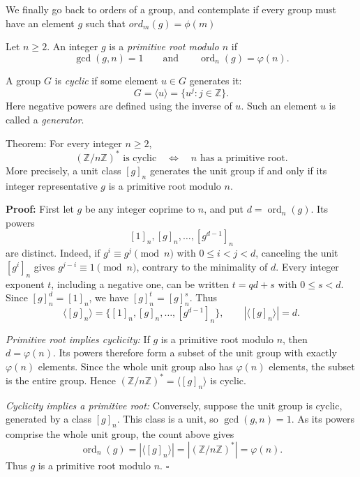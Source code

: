 \documentclass[a4paper,11pt,abstracton]{scrartcl}
\theoremstyle{dotlessP}
\theoremstyle{dotlessS}
\theoremstyle{remark}
\theoremstyle{definition}
\begin{document}
We finally go back to orders of a group, and contemplate if every group must have an element $g$ such that $ord_m(g)=\phi(m)$  

\begin{definition_box}
Let $n\geq2$. An integer $g$ is a \emph{primitive root modulo $n$} if
\[
    \gcd(g,n)=1\qquad\text{and}\qquad
    \operatorname{ord}_n(g)=\varphi(n).
\]
\end{definition_box}


\begin{definition_box}
A group $G$ is \emph{cyclic} if some element $u\in G$ generates it:
\[
    G=\langle u\rangle=\{u^j:j\in\mathbb{Z}\}.
\]
Here negative powers are defined using the inverse of $u$.
Such an element $u$ is called a \emph{generator}.
\end{definition_box}


\begin{mainbox}{Theorem:}
For every integer $n\geq2$,
\[
    \boxed{(\mathbb{Z}/n\mathbb{Z})^*\text{ is cyclic}
    \quad\Longleftrightarrow\quad n\text{ has a primitive root}.}
\]
More precisely, a unit class $[g]_n$ generates the unit group if and
only if its integer representative $g$ is a primitive root modulo $n$.
\end{mainbox}

\textbf{Proof:}
First let $g$ be any integer coprime to $n$, and put
$d=\operatorname{ord}_n(g)$. Its powers
\[
    [1]_n,[g]_n,\ldots,[g^{d-1}]_n
\]
are distinct. Indeed, if $g^i\equiv g^j\pmod n$ with $0\leq i<j<d$,
canceling the unit $[g^i]_n$ gives $g^{j-i}\equiv1\pmod n$,
contrary to the minimality of $d$.
Every integer exponent $t$, including a negative one, can be written
$t=qd+s$ with $0\leq s<d$. Since $[g]_n^d=[1]_n$, we have
$[g]_n^t=[g]_n^s$. Thus
\[
    \langle[g]_n\rangle
    =\{[1]_n,[g]_n,\ldots,[g^{d-1}]_n\},\qquad
    |\langle[g]_n\rangle|=d.
\]


\textit{Primitive root implies cyclicity:}
If $g$ is a primitive root modulo $n$, then $d=\varphi(n)$.
Its powers therefore form a subset of the unit group with exactly
$\varphi(n)$ elements. Since the whole unit group also has
$\varphi(n)$ elements, the subset is the entire group.
Hence $(\mathbb{Z}/n\mathbb{Z})^*=\langle[g]_n\rangle$ is cyclic.

\textit{Cyclicity implies a primitive root:}
Conversely, suppose the unit group is cyclic, generated by a class
$[g]_n$. This class is a unit, so $\gcd(g,n)=1$.
As its powers comprise the whole unit group, the count above gives
\[
    \operatorname{ord}_n(g)=|\langle[g]_n\rangle|
    =|(\mathbb{Z}/n\mathbb{Z})^*|=\varphi(n).
\]
Thus $g$ is a primitive root modulo $n$.
\hfill$\square$
\end{document}
